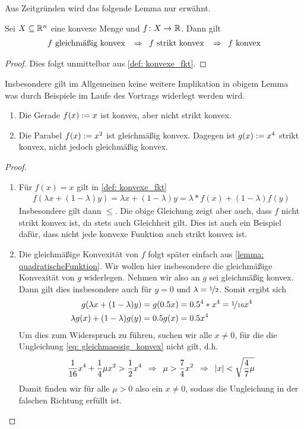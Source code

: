 \documentclass[ %
ngerman, %
a4paper, 
11pt,%
sectionreset, %
chapterstyle=framed, %
sectionstyle=pure, %
titlefont=osfamily %
]{../texmf/tex/latex/mathscriptMathTUD/mathscriptMathTUD}
\begin{document}
Aus Zeitgründen wird das folgende Lemma nur erwähnt.
\begin{*lemma}
   	Sei $X \subseteq \mathbb{R}^n$ eine konvexe Menge und $\abb{f}{X}{\R}$. Dann gilt
   	\begin{align*}
   		f \text{ gleichmäßig konvex } \enskip \Rightarrow \enskip f \text{ strikt konvex } \enskip \Rightarrow \enskip f \text{ konvex}
   	\end{align*}
\end{*lemma}
\begin{proof}
	Dies folgt unmittelbar aus \cref{def: konvexe_fkt}.
\end{proof}

Insbesondere gilt im Allgemeinen keine weitere Implikation in obigem Lemma was durch Beispiele im Laufe des Vortrags widerlegt werden wird.

\begin{beispiel}
   	\begin{enumerate}[leftmargin=*, nolistsep, label=(\roman*)]
   		\item Die Gerade $f(x) \mathrel{:=} x$ ist konvex, aber nicht strikt konvex.
   		\item Die Parabel $f(x) \mathrel{:=} x^2$ ist gleichmäßig konvex. Dagegen ist $g(x) \mathrel{:=} x^4$ strikt konvex, nicht jedoch gleichmäßig konvex. 
   	\end{enumerate}
\end{beispiel}
\begin{proof}
	\begin{enumerate}[leftmargin=*, nolistsep, label=(\roman*)]
		\item Für $f(x) = x$ gilt in \eqref{def: konvexe_fkt}
		\begin{align*}
			f(\lambda x + (1-\lambda)y) = \lambda x + (1-\lambda) y = \lambda * f(x) + (1-\lambda) f(y)
		\end{align*}
		Insbesondere gilt dann $\leq$. Die obige Gleichung zeigt aber auch, dass $f$ nicht strikt konvex ist, da stets auch Gleichheit gilt. Dies ist auch ein Beispiel dafür, dass nicht jede konvexe Funktion auch strikt konvex ist. 
		\item Die gleichmäßige Konvexität von $f$ folgt später einfach aus \cref{lemma: quadratischeFunktion}. Wir wollen hier insbesondere die gleichmäßige Konvexität von $g$ widerlegen. Nehmen wir also an $g$ sei gleichmäßig konvex. Dann gilt dies insbesondere auch für $y=0$ und $\lambda = \lfrac{1}{2}$. Somit ergibt sich
		\begin{align*}
			g( \lambda x + (1-\lambda) y ) &= g(0.5 x) = 0.5^4 * x^4 = \lfrac{1}{16} x^4 \\
			\lambda g(x) + (1-\lambda) g(y) &= 0.5 g(x) = 0.5 x^4
		\end{align*}
		Um dies zum Widerspruch zu führen, suchen wir alle $x \neq 0$, für die die Ungleichung \eqref{eq: gleichmaessig_konvex} nicht gilt, d.h.
		\begin{align*}
			\frac{1}{16}x^4 + \frac{1}{4} \mu x^2 > \frac{1}{2} x^4 \enskip \Rightarrow \enskip \mu > \frac{7}{4}x^2 \enskip \Rightarrow \enskip \left| x \right| < \sqrt{\frac{4}{7} \mu}
		\end{align*}
		Damit finden wir für alle $\mu > 0$ also ein $x \neq 0$, sodass die Ungleichung in der falschen Richtung erfüllt ist.
	\end{enumerate}
\end{proof}
\end{document}
